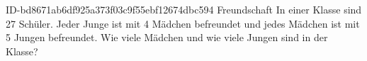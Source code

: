 \begin{exercise}
      {ID-bd8671ab6df925a373f03c9f55ebf12674dbc594}
      {Freundschaft}
  \ifproblem\problem
    In einer Klasse sind 27 Schüler. Jeder Junge ist mit 4 Mädchen befreundet
    und jedes Mädchen ist mit 5 Jungen befreundet. Wie viele Mädchen und wie
    viele Jungen sind in der Klasse?
  \fi
\end{exercise}
